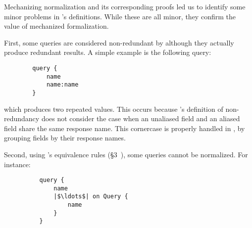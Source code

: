 Mechanizing normalization and its corresponding proofs led us to identify 
some minor problems in \HP's definitions. While these are all minor, they confirm the value of mechanized formalization.

First, some queries are considered non-redundant by \HP although they actually produce redundant results.
A simple example is the following query:

\begin{verbatim}
        query {
            name
            name:name
        }
\end{verbatim}
which produces two repeated values. This occurs because \HP's definition of non-redundancy does not consider the case when an unaliased field and an aliased field share the same response name. This cornercase is properly handled in \gcoql, by grouping fields by their response names.

Second, using \HP's equivalence rules (\cf \S3~\cite{gqlph}), some queries cannot be normalized. For instance:
\begin{verbatim}
          query {
              name
              |$\ldots$| on Query {
                  name
              }
          }
\end{verbatim}

